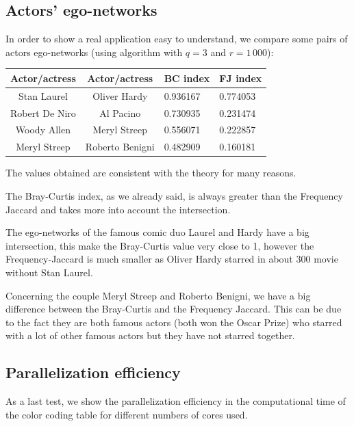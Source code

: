 \subsection*{Actors' ego-networks}

In order to show a real application easy to understand, we compare
some pairs of actors ego-networks (using \fcount algorithm with $q=3$ and $r=1\,000$):\medskip

\begin{table}[h]
	\centering
	\begin{tabular}{c|c|l|l}
		Actor/actress  & Actor/actress   & BC index & FJ index \\ 
		\hline
		Stan Laurel    & Oliver Hardy    & 0.936167 & 0.774053 \\
		Robert De Niro & Al Pacino       & 0.730935 & 0.231474 \\
		Woody Allen    & Meryl Streep    & 0.556071 & 0.222857 \\
		Meryl Streep   & Roberto Benigni & 0.482909 & 0.160181 \\
	\end{tabular}
\end{table}

\medskip

The values obtained are consistent with the theory for many reasons. \medskip

The Bray-Curtis index, as we already said, is always greater than the Frequency Jaccard and takes more into account the intersection.

The ego-networks of the famous comic duo Laurel and Hardy have a big intersection, this make the Bray-Curtis value very close to 1, however the Frequency-Jaccard is much smaller as Oliver Hardy starred in about $300$ movie without Stan Laurel.

Concerning the couple Meryl Streep and Roberto Benigni, we have a big difference between the Bray-Curtis and the Frequency Jaccard. This can be due to the fact they are both famous actors (both won the Oscar Prize) who starred with a lot of other famous actors but they have not starred together.

\subsection*{Parallelization efficiency}

As a last test, we show the parallelization efficiency in the computational time of the color coding table for different numbers of cores used.

